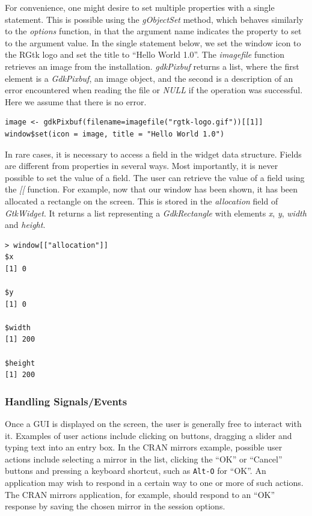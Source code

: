 \documentclass[article]{jss}
\begin{document}
For convenience, one might desire to set multiple properties with a single statement.
This is possible using the \emph{gObjectSet} method, which behaves similarly
to the  \emph{options} function, in that the argument name indicates
the property to set to the argument value. In the single statement below, we 
set the window icon to the RGtk logo and set the title to ``Hello World 1.0''. 
The \emph{imagefile} function retrieves an image from the  installation.
\emph{gdkPixbuf} returns a list, where the first element is a \emph{GdkPixbuf}, an image object,
and the second is a description of an error encountered when reading the file
or \emph{NULL} if the operation was successful. Here we assume that there is no error.
\begin{verbatim}
image <- gdkPixbuf(filename=imagefile("rgtk-logo.gif"))[[1]]
window$set(icon = image, title = "Hello World 1.0")
\end{verbatim}

In rare cases, it is necessary to access a field in the widget data structure.
Fields are different from properties in several ways. Most importantly, it is
never possible to set the value of a field. The user can retrieve the value of
a field using the \emph{[[} function. For example, now that our window
has been shown, it has been allocated a rectangle on the screen. This is stored
in the \emph{allocation} field of \emph{GtkWidget}. It returns a list 
representing a \emph{GdkRectangle} with
elements \emph{x}, \emph{y}, \emph{width} and \emph{height}.
\begin{verbatim}
> window[["allocation"]]
$x
[1] 0

$y
[1] 0

$width
[1] 200

$height
[1] 200
\end{verbatim}

\subsubsection{Handling Signals/Events}

Once a GUI is displayed on the screen, the user is 
generally free to interact with it. Examples of user actions include 
clicking on buttons, dragging a slider and typing text into an entry box.
In the CRAN mirrors example, possible user actions include
selecting a mirror in the list, clicking the ``OK'' or ``Cancel'' buttons 
and pressing a keyboard shortcut, such as \texttt{Alt-O} for ``OK''. 
An application may wish to respond in a certain way to one or more of such actions.
The CRAN mirrors application, for example, should respond to an ``OK'' response
by saving the chosen mirror in the session options.
\end{document}
